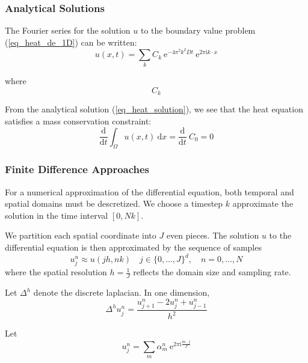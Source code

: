\documentclass[12pt, reqno]{article}
\theoremstyle{definition}
\theoremstyle{remark}
\newcommand{\ud}{\mathrm{d}}
\newcommand{\e}{\mathrm{e}}
\renewcommand{\i}{\mathrm{i}}
\begin{document}
\subsubsection{Analytical Solutions} \label{sssec_analytical}


The Fourier series for the solution $u$ to the boundary value problem (\ref{eq_heat_de_1D}) can be written:
\begin{equation} \label{eq_heat_solution}
    u(x,t)=\sum_{k}C_k ~\e^{-4\pi^2k^2Dt}~\mathrm{e}^{2\pi\i k\cdot x}
\end{equation}

where 
\begin{equation}
    C_k
\end{equation}

From the analytical solution (\ref{eq_heat_solution}), we see that the heat equation satisfies a mass conservation constraint:
\begin{equation*}
    \frac{\ud}{\ud t}\int_\Omega u(x,t)~\ud x=\frac{\ud}{\ud t}~C_0=0
\end{equation*}

\subsubsection{Finite Difference Approaches} \label{sssec_heat_fd}


For a numerical approximation of the differential equation, both temporal and spatial domains must be descretized. We choose a timestep $k$ approximate the solution in the time interval $[0, Nk]$.

We partition each spatial coordinate into $J$ even pieces. The solution $u$ to the differential equation is then approximated by the sequence of samples
\begin{equation*}
	u_j^n\approx u(jh,nk)\quad j\in\{0,\ldots,J\}^d,\quad n=0,\ldots,N
\end{equation*}
where the spatial resolution $h=\frac{1}{J}$ reflects the domain size and sampling rate.




Let $\Delta^h$ denote the discrete laplacian. In one dimension, 
\begin{equation}
    \Delta^hu_j^n=\frac{u_{j+1}^n-2u_j^n+u_{j-1}^n}{h^2}
\end{equation}

Let 
\begin{equation}
    u_j^n=\sum_{m}\alpha_m^n~\e^{2\pi\i\frac{m\cdot j}{J}}
\end{equation}
\end{document}
